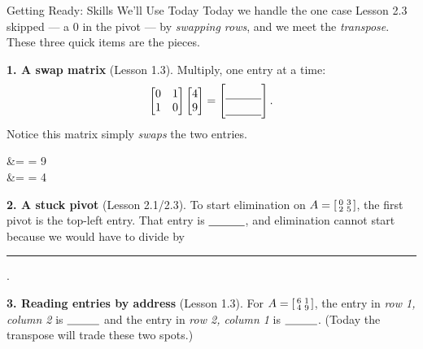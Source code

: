 \documentclass[10pt]{article}
\begin{document}

\vspace{0.12in}

\begin{notesbox}{Getting Ready: Skills We'll Use Today}
\small Today we handle the one case Lesson 2.3 skipped --- a $0$ in the pivot --- by \emph{swapping rows},
and we meet the \emph{transpose}. These three quick items are the pieces.

\vspace{4pt}
\textbf{1. A swap matrix} (Lesson 1.3). Multiply, one entry at a time:
\[
  \begin{bmatrix} 0 & 1 \\ 1 & 0 \end{bmatrix}
  \begin{bmatrix} 4 \\ 9 \end{bmatrix}
  = \begin{bmatrix}\rule{0pt}{1.1em}\blank{1.1cm}\\[2pt]\blank{1.1cm}\end{bmatrix}.
\]
Notice this matrix simply \emph{swaps} the two entries.
\begin{work}
   &=  = 9 \\
   &=  = 4
\end{work}

\vspace{4pt}
\textbf{2. A stuck pivot} (Lesson 2.1/2.3). To start elimination on
$A=\begin{bsmallmatrix} 0&3\\2&5 \end{bsmallmatrix}$, the first pivot is the top-left entry. That entry is
$\blank{1.1cm}$, and elimination cannot start because we would have to divide by
\rule[-2pt]{2.2cm}{0.6pt}.

\vspace{4pt}
\textbf{3. Reading entries by address} (Lesson 1.3). For $A=\begin{bsmallmatrix} 6&1\\4&9 \end{bsmallmatrix}$,
the entry in \emph{row 1, column 2} is $\blank{1.0cm}$ and the entry in \emph{row 2, column 1} is
$\blank{1.0cm}$. (Today the transpose will trade these two spots.)
\end{notesbox}
\end{document}
